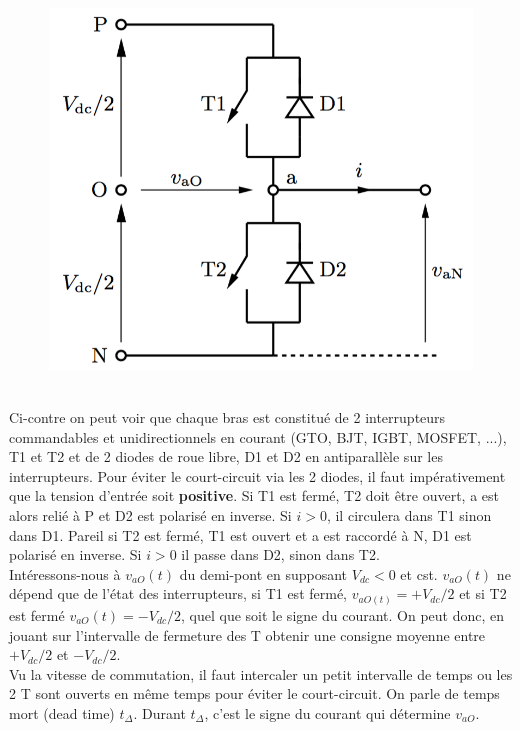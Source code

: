 		\begin{figure}
		\vspace{-5mm}
		\includegraphics[scale=0.3]{ch4/8}
		\end{figure}
		\ \\ Ci-contre on peut voir que chaque bras est constitué de 2 interrupteurs commandables et unidirectionnels en courant (GTO, BJT, IGBT, MOSFET, ...), T1 et T2 et de 2 diodes de roue libre, D1 et D2 en  antiparallèle sur les interrupteurs. Pour éviter le court-circuit via les 2 diodes, il faut impérativement que la tension d'entrée soit \textbf{positive}. Si T1 est fermé, T2 doit être ouvert, a est alors relié à P et D2 est polarisé en inverse. Si $i>0$, il circulera dans T1 sinon dans D1. Pareil si T2 est fermé, T1 est ouvert et a est raccordé à N, D1 est polarisé en inverse. Si $i>0$ il passe dans D2, sinon dans T2. \\
		
		Intéressons-nous à $v_{aO}(t)$ du demi-pont en supposant $V_{dc}<0$ et cst. $v_{aO}(t)$ ne dépend que de l'état des interrupteurs, si T1 est fermé, $v_{aO(t)} = + V_{dc}/2$ et si T2 est fermé $v_{aO}(t) = -V_{dc}/2$, quel que soit le signe du courant. On peut donc, en jouant sur l'intervalle de fermeture des T obtenir une consigne moyenne entre $+V_{dc}/2$ et $-V_{dc}/2$. \\
		
		Vu la vitesse de commutation, il faut intercaler un petit intervalle de temps ou les 2 T sont ouverts en même temps pour éviter le court-circuit. On parle de temps mort (dead time) $t_{\Delta}$. Durant $t_{\Delta}$, c'est le signe du courant qui détermine $v_{aO}$. 
		
